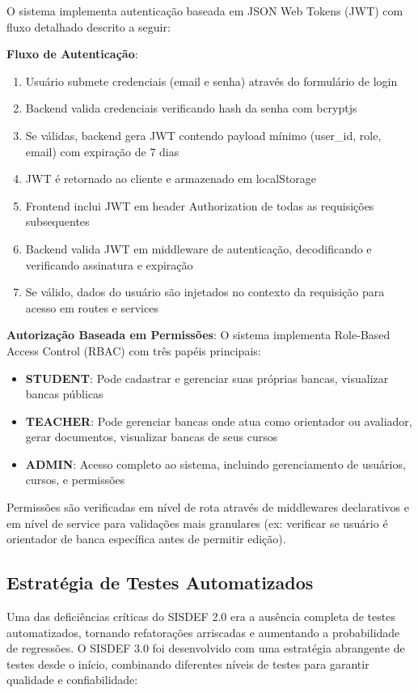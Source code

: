 \documentclass[nonacm, sigconf]{acmart}
\begin{document}
O sistema implementa autenticação baseada em JSON Web Tokens (JWT) com fluxo detalhado descrito a seguir:

\textbf{Fluxo de Autenticação}:
\begin{enumerate}
\item Usuário submete credenciais (email e senha) através do formulário de login
\item Backend valida credenciais verificando hash da senha com bcryptjs
\item Se válidas, backend gera JWT contendo payload mínimo (user\_id, role, email) com expiração de 7 dias
\item JWT é retornado ao cliente e armazenado em localStorage
\item Frontend inclui JWT em header Authorization de todas as requisições subsequentes
\item Backend valida JWT em middleware de autenticação, decodificando e verificando assinatura e expiração
\item Se válido, dados do usuário são injetados no contexto da requisição para acesso em routes e services
\end{enumerate}

\textbf{Autorização Baseada em Permissões}: O sistema implementa Role-Based Access Control (RBAC) com três papéis principais:

\begin{itemize}
\item \textbf{STUDENT}: Pode cadastrar e gerenciar suas próprias bancas, visualizar bancas públicas
\item \textbf{TEACHER}: Pode gerenciar bancas onde atua como orientador ou avaliador, gerar documentos, visualizar bancas de seus cursos
\item \textbf{ADMIN}: Acesso completo ao sistema, incluindo gerenciamento de usuários, cursos, e permissões
\end{itemize}

Permissões são verificadas em nível de rota através de middlewares declarativos e em nível de service para validações mais granulares (ex: verificar se usuário é orientador de banca específica antes de permitir edição).

\subsection{Estratégia de Testes Automatizados}

Uma das deficiências críticas do SISDEF 2.0 era a ausência completa de testes automatizados, tornando refatorações arriscadas e aumentando a probabilidade de regressões. O SISDEF 3.0 foi desenvolvido com uma estratégia abrangente de testes desde o início, combinando diferentes níveis de testes para garantir qualidade e confiabilidade:
\end{document}
